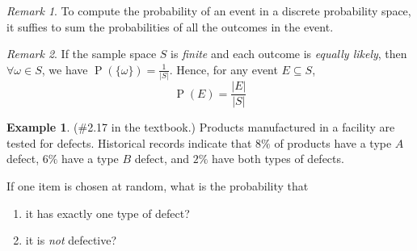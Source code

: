 \documentclass[11pt]{article}
\theoremstyle{definition}
\newtheorem{eg}{Example}
\theoremstyle{remark}
\newtheorem{rem}{Remark}[section]
\newcommand{\parens}[1]{\left(#1\right)}
\DeclareMathOperator{\Prob}{P}
\renewcommand{\P}[1]{\Prob{\parens{#1}}}
\begin{document}
\begin{rem}
    To compute the probability of an event in a discrete probability space, it
    suffies to sum the probabilities of all the outcomes in the event.
\end{rem}

\begin{rem}
    If the sample space $S$ is \emph{finite} and each outcome is
    \emph{equally likely}, then $\forall \omega \in S$, we have
    $\P{\{\omega\}} = \frac{1}{|S|}$. Hence, for any event $E \subseteq S$,
    \begin{equation*}
        \P{E} = \frac{|E|}{|S|}
    \end{equation*}
\end{rem}

\begin{eg}{(\#2.17 in the textbook.)}
    Products manufactured in a facility are tested for defects. Historical
    records indicate that $8\%$ of products have a type $A$ defect, $6\%$ have
    a type $B$ defect, and $2\%$ have both types of defects.

    If one item is chosen at random, what is the probability that
    \begin{enumerate}
        \item it has exactly one type of defect?
        \item it is \emph{not} defective?
    \end{enumerate}
\end{eg}
\end{document}
